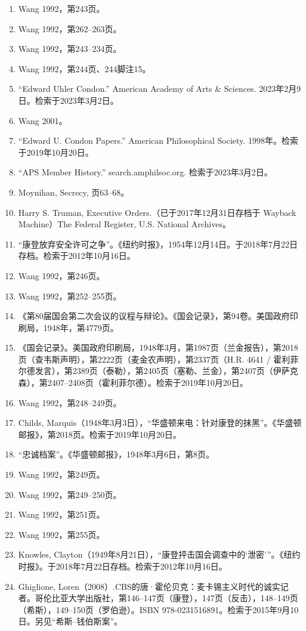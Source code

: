 \begin{enumerate}
\item Wang 1992，第243页。
\item Wang 1992，第262–263页。
\item Wang 1992，第243–234页。
\item Wang 1992，第244页、244脚注15。
\item “Edward Uhler Condon.” American Academy of Arts & Sciences. 2023年2月9日。检索于2023年3月2日。
\item Wang 2001。
\item “Edward U. Condon Papers.” American Philosophical Society. 1998年。检索于2019年10月20日。
\item “APS Member History.” search.amphilsoc.org. 检索于2023年3月2日。
\item Moynihan, Secrecy, 页63–68。
\item Harry S. Truman, Executive Orders.（已于2017年12月31日存档于 Wayback Machine）The Federal Register, U.S. National Archives。
\item “康登放弃安全许可之争”。《纽约时报》，1954年12月14日。于2018年7月22日存档。检索于2012年10月16日。
\item Wang 1992，第246页。
\item Wang 1992，第252–255页。
\item 《第80届国会第二次会议的议程与辩论》。《国会记录》，第94卷。美国政府印刷局，1948年，第4779页。
\item 《国会记录》。美国政府印刷局，1948年3月，第1987页（兰金报告），第2018页（查韦斯声明），第2222页（麦金农声明），第2337页（H.R. 4641 / 霍利菲尔德发言），第2389页（泰勒），第2405页（塞勒、兰金），第2407页（伊萨克森），第2407–2408页（霍利菲尔德）。检索于2019年10月20日。
\item Wang 1992，第248–249页。
\item Childs, Marquis（1948年3月3日），“华盛顿来电：针对康登的抹黑”。《华盛顿邮报》，第2018页。检索于2019年10月20日。
\item “忠诚档案”。《华盛顿邮报》，1948年3月6日，第8页。
\item Wang 1992，第249页。
\item Wang 1992，第249–250页。
\item Wang 1992，第251页。
\item Wang 1992，第255页。
\item Knowles, Clayton（1949年8月21日），“康登抨击国会调查中的‘泄密’”。《纽约时报》。于2018年7月22日存档。检索于2012年10月16日。
\item Ghiglione, Loren（2008）.CBS的唐·霍伦贝克：麦卡锡主义时代的诚实记者。哥伦比亚大学出版社，第146–147页（康登），147页（反击），148–149页（希斯），149–150页（罗伯逊）。ISBN 978-0231516891。检索于2015年9月10日。另见“希斯–钱伯斯案”。

\end{enumerate}
